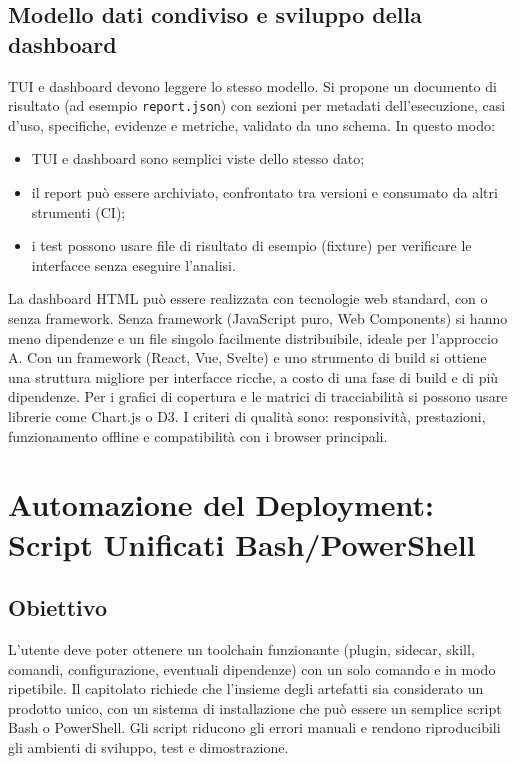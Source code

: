 \documentclass[a4paper, 11pt]{article}
\begin{document}
\subsection{Modello dati condiviso e sviluppo della dashboard}
TUI e dashboard devono leggere lo stesso modello. Si propone un documento di risultato (ad esempio \texttt{report.json}) con sezioni per metadati dell'esecuzione, casi d'uso, specifiche, evidenze e metriche, validato da uno schema. In questo modo:
\begin{itemize}[noitemsep]
    \item TUI e dashboard sono semplici viste dello stesso dato;
    \item il report può essere archiviato, confrontato tra versioni e consumato da altri strumenti (CI);
    \item i test possono usare file di risultato di esempio (fixture) per verificare le interfacce senza eseguire l'analisi.
\end{itemize}
La dashboard HTML può essere realizzata con tecnologie web standard, con o senza framework. Senza framework (JavaScript puro, Web Components) si hanno meno dipendenze e un file singolo facilmente distribuibile, ideale per l'approccio A. Con un framework (React, Vue, Svelte) e uno strumento di build si ottiene una struttura migliore per interfacce ricche, a costo di una fase di build e di più dipendenze. Per i grafici di copertura e le matrici di tracciabilità si possono usare librerie come Chart.js o D3. I criteri di qualità sono: responsività, prestazioni, funzionamento offline e compatibilità con i browser principali.


\section{Automazione del Deployment: Script Unificati Bash/PowerShell}
\label{sec:deploy}

\subsection{Obiettivo}
L'utente deve poter ottenere un toolchain funzionante (plugin, sidecar, skill, comandi, configurazione, eventuali dipendenze) con un solo comando e in modo ripetibile. Il capitolato richiede che l'insieme degli artefatti sia considerato un prodotto unico, con un sistema di installazione che può essere un semplice script Bash o PowerShell. Gli script riducono gli errori manuali e rendono riproducibili gli ambienti di sviluppo, test e dimostrazione.
\end{document}
